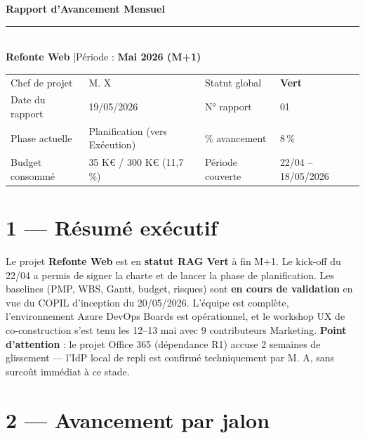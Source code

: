 \documentclass[11pt,a4paper,oneside]{report}
\newcommand{\ragV}{\cellcolor{cnGreen!20}\textbf{\textcolor{cnGreen}{Vert}}}
\begin{document}
\small

\begin{center}
{\LARGE\bfseries\color{cnNavy} Rapport d'Avancement Mensuel}\\[4pt]
\textcolor{cnOrange}{\rule{10cm}{1pt}}\\[4pt]
{\large\color{cnSlate} \textbf{Refonte Web} \quad|\quad Période : \textbf{Mai 2026 (M+1)}}
\end{center}

\vspace{4pt}
\renewcommand{\arraystretch}{1.4}
\begin{tabularx}{\textwidth}{L{3.5cm} Y L{3.5cm} Y}
\toprule
{} &  &  &  \\
\midrule
Chef de projet  & M. X              & Statut global  & \ragV \\
Date du rapport & 19/05/2026             & N° rapport     & 01 \\
Phase actuelle  & Planification (vers Exécution) & \% avancement  & 8\,\% \\
Budget consommé & 35 K€ / 300 K€ (11{,}7\,\%) & Période couverte & 22/04 -- 18/05/2026 \\
\bottomrule
\end{tabularx}

\section*{1 --- Résumé exécutif}

Le projet \textbf{Refonte Web} est en \textbf{statut RAG Vert} à fin M+1. Le kick-off du 22/04 a permis de signer la charte et de lancer la phase de planification. Les baselines (PMP, WBS, Gantt, budget, risques) sont \textbf{en cours de validation} en vue du COPIL d'inception du 20/05/2026. L'équipe est complète, l'environnement Azure DevOps Boards est opérationnel, et le workshop UX de co-construction s'est tenu les 12--13 mai avec 9 contributeurs Marketing. \textbf{Point d'attention} : le projet Office 365 (dépendance R1) accuse 2 semaines de glissement --- l'IdP local de repli est confirmé techniquement par M. A, sans surcoût immédiat à ce stade.

\section*{2 --- Avancement par jalon}
\end{document}
